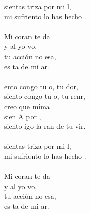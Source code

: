 \begin{cancion}%
	 sientas  triza por mi l, \\
	mi sufriento lo has hecho . \\
\jump\\
	Mi coran te da \\
	y al yo vo, \\
	tu acción no esa,\\
	es ta de mi ar.\\
\jump\\
	ento congo tu o, tu dor,\\
	siento congo tu o, tu renr,\\
	creo que mima \\
	sien A por ,\\
	siento igo la ran de tu vir.\\
\jump\\
	 sientas  triza por mi l, \\
	mi sufriento lo has hecho . \\
\jump\\
	Mi coran te da \\
	y al yo vo, \\
	tu acción no esa,\\
	es ta de mi ar.\\
\end{cancion}%
